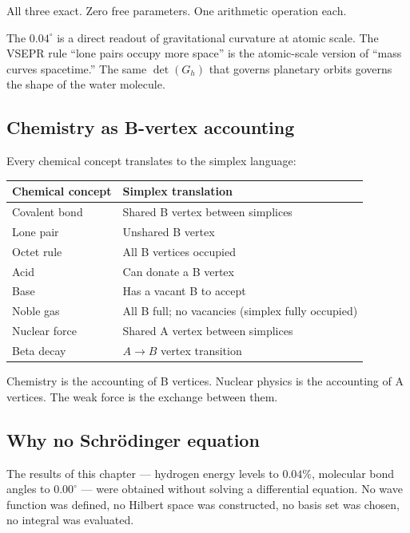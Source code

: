 All three exact. Zero free parameters. One arithmetic operation each.

\begin{remark}
The $0.04^\circ$ is a direct readout of gravitational curvature at atomic scale. The VSEPR rule ``lone pairs occupy more space'' is the atomic-scale version of ``mass curves spacetime.'' The same $\det(G_h)$ that governs planetary orbits governs the shape of the water molecule.
\end{remark}

\subsection{Chemistry as B-vertex accounting}

Every chemical concept translates to the simplex language:

\begin{center}
\begin{tabular}{ll}
\hline
Chemical concept & Simplex translation \\
\hline
Covalent bond & Shared B vertex between simplices \\
Lone pair & Unshared B vertex \\
Octet rule & All B vertices occupied \\
Acid & Can donate a B vertex \\
Base & Has a vacant B to accept \\
Noble gas & All B full; no vacancies (simplex fully occupied) \\
Nuclear force & Shared A vertex between simplices \\
Beta decay & $A \to B$ vertex transition \\
\hline
\end{tabular}
\end{center}

Chemistry is the accounting of B vertices. Nuclear physics is the accounting of A vertices. The weak force is the exchange between them.

\subsection{Why no Schr\"odinger equation}

The results of this chapter --- hydrogen energy levels to $0.04\%$, molecular bond angles to $0.00^\circ$ --- were obtained without solving a differential equation. No wave function was defined, no Hilbert space was constructed, no basis set was chosen, no integral was evaluated.

